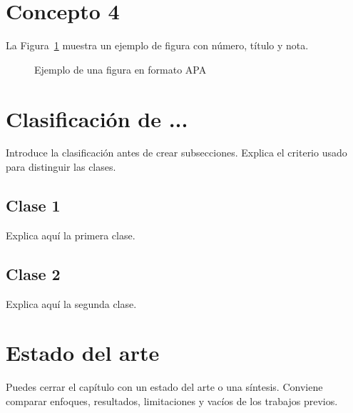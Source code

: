 \section{Concepto 4}

La Figura~\ref{fig:ejemplo} muestra un ejemplo de figura con número, título y nota.

\begin{figure}[htbp]
  \caption{Ejemplo de una figura en formato APA}
  \label{fig:ejemplo}
  \begin{center}
    \fbox{\rule{0pt}{5cm}\rule{0.80\textwidth}{0pt}}
  \end{center}
\end{figure}

\section{Clasificación de ...}

Introduce la clasificación antes de crear subsecciones. Explica el criterio usado para distinguir las clases.

\subsection{Clase 1}

Explica aquí la primera clase.

\subsection{Clase 2}

Explica aquí la segunda clase.

\section{Estado del arte}

Puedes cerrar el capítulo con un estado del arte o una síntesis. Conviene comparar enfoques, resultados, limitaciones y vacíos de los trabajos previos.

